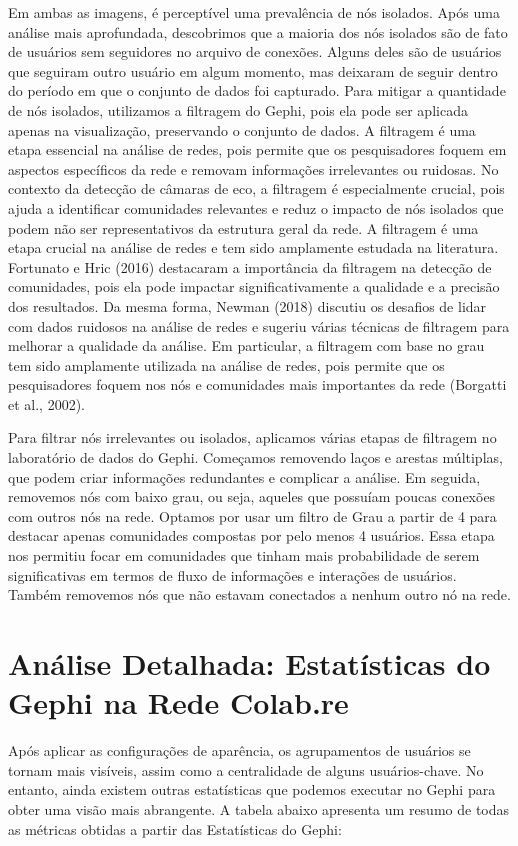 Em ambas as imagens, é perceptível uma prevalência de nós isolados. Após uma análise mais aprofundada, descobrimos que a maioria dos nós isolados são de fato de usuários sem seguidores no arquivo de conexões. Alguns deles são de usuários que seguiram outro usuário em algum momento, mas deixaram de seguir dentro do período em que o conjunto de dados foi capturado. Para mitigar a quantidade de nós isolados, utilizamos a filtragem do Gephi, pois ela pode ser aplicada apenas na visualização, preservando o conjunto de dados. A filtragem é uma etapa essencial na análise de redes, pois permite que os pesquisadores foquem em aspectos específicos da rede e removam informações irrelevantes ou ruidosas. No contexto da detecção de câmaras de eco, a filtragem é especialmente crucial, pois ajuda a identificar comunidades relevantes e reduz o impacto de nós isolados que podem não ser representativos da estrutura geral da rede. A filtragem é uma etapa crucial na análise de redes e tem sido amplamente estudada na literatura. Fortunato e Hric (2016) destacaram a importância da filtragem na detecção de comunidades, pois ela pode impactar significativamente a qualidade e a precisão dos resultados. Da mesma forma, Newman (2018) discutiu os desafios de lidar com dados ruidosos na análise de redes e sugeriu várias técnicas de filtragem para melhorar a qualidade da análise. Em particular, a filtragem com base no grau tem sido amplamente utilizada na análise de redes, pois permite que os pesquisadores foquem nos nós e comunidades mais importantes da rede (Borgatti et al., 2002).

Para filtrar nós irrelevantes ou isolados, aplicamos várias etapas de filtragem no laboratório de dados do Gephi. Começamos removendo laços e arestas múltiplas, que podem criar informações redundantes e complicar a análise. Em seguida, removemos nós com baixo grau, ou seja, aqueles que possuíam poucas conexões com outros nós na rede. Optamos por usar um filtro de Grau a partir de 4 para destacar apenas comunidades compostas por pelo menos 4 usuários. Essa etapa nos permitiu focar em comunidades que tinham mais probabilidade de serem significativas em termos de fluxo de informações e interações de usuários. Também removemos nós que não estavam conectados a nenhum outro nó na rede.

\section{Análise Detalhada: Estatísticas do Gephi na Rede Colab.re}
Após aplicar as configurações de aparência, os agrupamentos de usuários se tornam mais visíveis, assim como a centralidade de alguns usuários-chave. No entanto, ainda existem outras estatísticas que podemos executar no Gephi para obter uma visão mais abrangente. A tabela abaixo apresenta um resumo de todas as métricas obtidas a partir das Estatísticas do Gephi:

